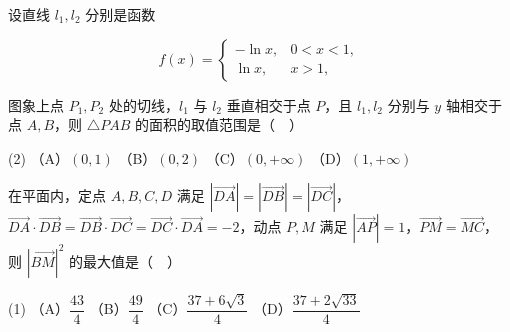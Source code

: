 \begin{question}
设直线 \(l_{1},l_{2}\) 分别是函数

\nopagebreak[4]
\[
f(x)=\begin{cases}
-\ln x, & 0<x<1,\\
\ln x, & x>1,
\end{cases}
\]

图象上点 \(P_{1},P_{2}\) 处的切线，\(l_{1}\) 与 \(l_{2}\) 垂直相交于点 \(P\)，且 \(l_{1},l_{2}\) 分别与 \(y\) 轴相交于点 \(A,B\)，则 \(\triangle PAB\) 的面积的取值范围是（　）

\begin{gkopts}(2)
\task （A）\((0,1)\)
\task （B）\((0,2)\)
\task （C）\((0,+\infty)\)
\task （D）\((1,+\infty)\)
\end{gkopts}

\end{question}
\begin{question}
在平面内，定点 \(A,B,C,D\) 满足 \(\left|\overrightarrow{DA}\right|=\left|\overrightarrow{DB}\right|=\left|\overrightarrow{DC}\right|\)，\(\overrightarrow{DA}\cdot\overrightarrow{DB}=\overrightarrow{DB}\cdot\overrightarrow{DC}=\overrightarrow{DC}\cdot\overrightarrow{DA}=-2\)，动点 \(P,M\) 满足 \(\left|\overrightarrow{AP}\right|=1\)，\(\overrightarrow{PM}=\overrightarrow{MC}\)，则 \(\left|\overrightarrow{BM}\right|^{2}\) 的最大值是（　）

\begin{gkopts}(1)
\task （A）\(\dfrac{43}{4}\)
\task （B）\(\dfrac{49}{4}\)
\task （C）\(\dfrac{37+6\sqrt{3}}{4}\)
\task （D）\(\dfrac{37+2\sqrt{33}}{4}\)
\end{gkopts}

\end{question}

